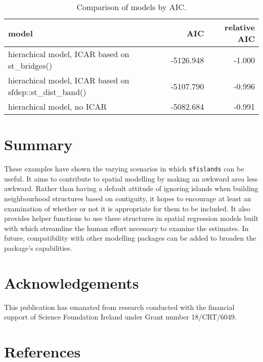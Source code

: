 \begin{table}

\caption{\label{tab:aic-latex}Comparison of models by AIC.}
\centering
\fontsize{8}{10}\selectfont
\begin{tabular}[t]{l|r|r}
\hline
\textbf{model} & \textbf{AIC} & \textbf{relative AIC}\\
\hline
hierachical model, ICAR based on st\_bridges() & -5126.948 & -1.000\\
\hline
hierachical model, ICAR based on sfdep::st\_dist\_band() & -5107.790 & -0.996\\
\hline
hierachical model, no ICAR & -5082.684 & -0.991\\
\hline
\end{tabular}
\end{table}

\hypertarget{summary}{%
\section{Summary}\label{summary}}

These examples have shown the varying scenarios in which \texttt{sfislands} can be useful. It aims to contribute to spatial modelling by making an awkward area less awkward. Rather than having a default attitude of ignoring islands when building neighbourhood structures based on contiguity, it hopes to encourage at least an examination of whether or not it is appropriate for them to be included. It also provides helper functions to use these structures in spatial regression models built with  which streamline the human effort necessary to examine the estimates. In future, compatibility with other modelling packages can be added to broaden the package's capabilities.

\hypertarget{acknowledgements}{%
\section{Acknowledgements}\label{acknowledgements}}

This publication has emanated from research conducted with the financial support of Science Foundation Ireland under Grant number 18/CRT/6049.

\hypertarget{references}{%
\section*{References}\label{references}}

